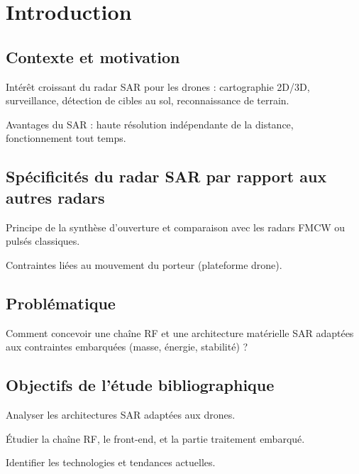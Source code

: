 \section{Introduction}\label{SEC:introdcution}

\subsection{Contexte et motivation}

Intérêt croissant du radar SAR pour les drones : cartographie 2D/3D, surveillance, détection de cibles au sol, reconnaissance de terrain.

Avantages du SAR : haute résolution indépendante de la distance, fonctionnement tout temps.


\subsection{Spécificités du radar SAR par rapport aux autres radars}

Principe de la synthèse d’ouverture et comparaison avec les radars FMCW ou pulsés classiques.

Contraintes liées au mouvement du porteur (plateforme drone).


\subsection{Problématique}

Comment concevoir une chaîne RF et une architecture matérielle SAR adaptées aux contraintes embarquées (masse, énergie, stabilité) ?


\subsection{Objectifs de l’étude bibliographique}

Analyser les architectures SAR adaptées aux drones.

Étudier la chaîne RF, le front-end, et la partie traitement embarqué.

Identifier les technologies et tendances actuelles.















